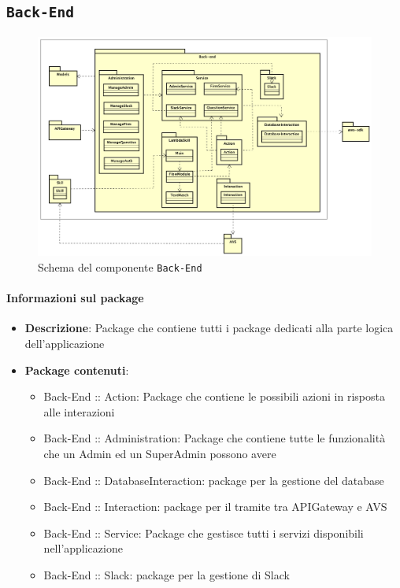 \documentclass[../DefinizioneDiProdotto.tex]{subfiles}
\begin{document}
\subsection{ \texttt{Back-End}}
\begin{figure}[!h]
	\centering
	\includegraphics[width=\textwidth]{Architettura/Back-end.png}
	\caption{Schema del componente \texttt{Back-End}}
\end{figure}
\paragraph{Informazioni sul package}\begin{itemize}\item \textbf{Descrizione}: Package che contiene tutti i package dedicati alla parte logica dell'applicazione\item \textbf{Package contenuti}:
	\begin{itemize}\item Back-End :: Action: Package che contiene le possibili azioni in risposta alle interazioni
	\item Back-End :: Administration: Package che contiene tutte le funzionalità che un Admin ed un SuperAdmin possono avere
	\item Back-End :: DatabaseInteraction: package per la gestione del database
	\item Back-End :: Interaction: package per il tramite tra APIGateway e AVS
	\item Back-End :: Service: Package che gestisce tutti i servizi disponibili nell'applicazione
	\item Back-End :: Slack: package per la gestione di Slack
	\end{itemize}\end{itemize}
\end{document}
